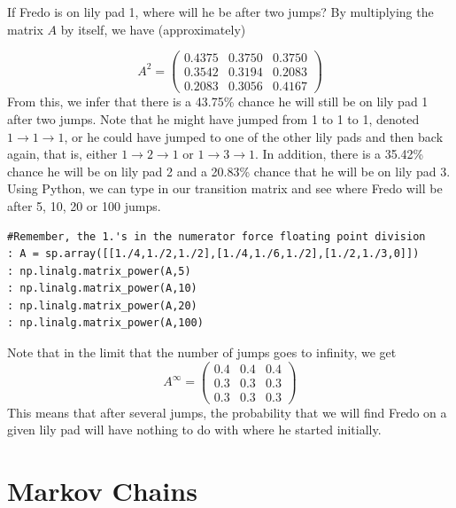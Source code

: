 If Fredo is on lily pad 1, where will he be after two jumps?
By multiplying the matrix $A$ by itself, we have (approximately)

\[
A^2 = \begin{pmatrix}
0.4375 & 0.3750 & 0.3750\\
0.3542 & 0.3194 & 0.2083\\
0.2083 & 0.3056 & 0.4167
\end{pmatrix}
\]
From this, we infer that there is a 43.75\% chance he will still be on lily pad 1 after two jumps.
Note that he might have jumped from 1 to 1 to 1, denoted $1 \rightarrow 1 \rightarrow 1$, or he could have jumped to one of the other lily pads and then back again, that is, either $1 \rightarrow 2 \rightarrow 1$ or $1 \rightarrow 3 \rightarrow 1$.
In addition, there is a 35.42\% chance he will be on lily pad 2 and a 20.83\% chance that he will be on lily pad 3.
Using Python, we can type in our transition matrix and see where Fredo will be after 5, 10, 20 or 100 jumps.

\begin{lstlisting}
#Remember, the 1.'s in the numerator force floating point division
: A = sp.array([[1./4,1./2,1./2],[1./4,1./6,1./2],[1./2,1./3,0]])
: np.linalg.matrix_power(A,5)
: np.linalg.matrix_power(A,10)
: np.linalg.matrix_power(A,20)
: np.linalg.matrix_power(A,100)
\end{lstlisting}

Note that in the limit that the number of jumps goes to infinity, we get
\[
A^\infty = \begin{pmatrix}
0.4 & 0.4 & 0.4\\
0.3 & 0.3 & 0.3\\
0.3 & 0.3 & 0.3
\end{pmatrix}
\]
This means that after several jumps, the probability that we will find Fredo on a given lily pad will have nothing to do with where he started initially.
 
\section*{Markov Chains}

